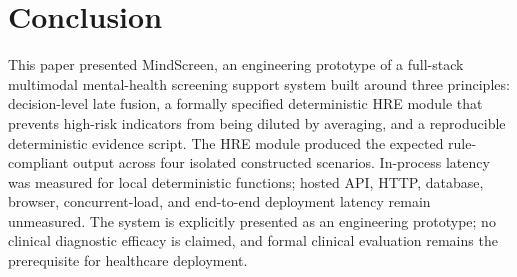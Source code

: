 \documentclass[10pt, conference, letterpaper]{IEEEtran}
\begin{document}
\section{Conclusion}
\label{sec:conclusion}

This paper presented MindScreen, an engineering prototype of a full-stack
multimodal mental-health screening support system built around three principles:
decision-level late fusion, a formally specified
deterministic HRE module that prevents high-risk indicators from being diluted
by averaging, and a reproducible deterministic evidence script.
The HRE module produced the expected rule-compliant output across four isolated
constructed scenarios. In-process latency was measured for local deterministic
functions; hosted API, HTTP, database, browser, concurrent-load, and end-to-end
deployment latency remain unmeasured.
The system is explicitly presented as an engineering prototype; no clinical
diagnostic efficacy is claimed, and formal clinical evaluation remains the
prerequisite for healthcare deployment.
\end{document}
